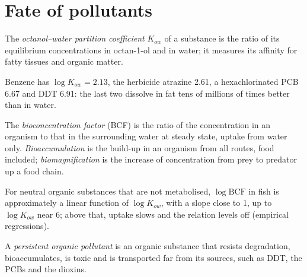 \section{Fate of pollutants}

\begin{definition}\label{def:b3:environmental-toxicology:kow}
The \emph{octanol--water partition coefficient}
$K_{ow}$ of a substance is the ratio of its equilibrium concentrations in
octan-1-ol and in water; it measures its affinity for fatty tissues and organic
matter.
\end{definition}

Benzene has $\log K_{ow} = 2.13$, the herbicide atrazine 2.61, a hexachlorinated PCB 6.67 and
DDT 6.91: the last two dissolve in fat tens of millions of times better than in
water.

\begin{definition}[Bioaccumulation]\label{def:b3:environmental-toxicology:bio}
The \emph{bioconcentration factor} (BCF) is the
ratio of the concentration in an organism to that in the surrounding water at
steady state, uptake from water only. \emph{Bioaccumulation}
is the build-up in an organism from all routes, food included;
\emph{biomagnification} is the increase of
concentration from prey to predator up a food chain.
\end{definition}

\begin{proposition}\label{prop:b3:environmental-toxicology:bcf-kow}
For neutral organic substances that are not metabolised, $\log\mathrm{BCF}$ in fish is
approximately a linear function of $\log K_{ow}$, with a slope close to 1, up to $\log K_{ow}$ near 6;
above that, uptake slows and the relation levels off (empirical regressions).
\admitted
\end{proposition}

\begin{definition}\label{def:b3:environmental-toxicology:pop}
A \emph{persistent organic pollutant} is an
organic substance that resists degradation, bioaccumulates, is toxic and is
transported far from its sources, such as DDT, the PCBs and the dioxins.
\end{definition}

